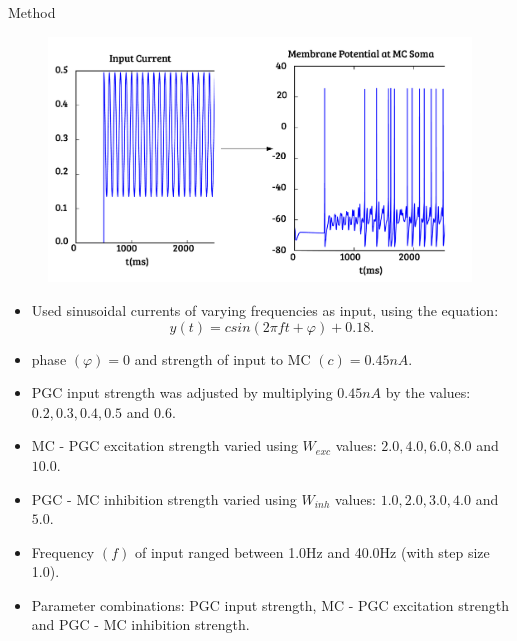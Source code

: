 \documentclass[final,hyperref={pdfpagelabels=false}]{beamer}
\begin{document}
\begin{frame}{}
\begin{columns}[t]
\begin{column}{.48\linewidth}
      \begin{block}{Method} 
      	\begin{figure}
      		\center
      		\includegraphics[scale=1.2]{images/Figure2}
      	\end{figure}
      	\begin{itemize}
      		\item Used sinusoidal currents of varying frequencies as input, using the equation:
      			\begin{equation}
      				y(t) = csin(2 \pi ft + \varphi) + 0.18. 
      			\end{equation}
      		\item phase $(\varphi) = 0$ and strength of input to MC $(c) = 0.45nA$.
      		\item PGC input strength was adjusted by multiplying $0.45nA$ by the values: $0.2, 0.3, 0.4, 0.5$ and $0.6$.
      		\item MC - PGC excitation strength varied using $W_{exc}$ values: $2.0, 4.0, 6.0, 8.0$ and $10.0$.
      		\item PGC - MC inhibition strength varied using $W_{inh}$ values: $1.0, 2.0, 3.0, 4.0$ and $5.0$.
      		\item Frequency $(f)$ of input ranged between 1.0Hz and 40.0Hz (with step size 1.0).
      		\item Parameter combinations: PGC input strength, MC - PGC excitation strength and PGC - MC inhibition strength.
      	\end{itemize}
      	\end{block}
      		
      		
      		
      		
      		
      		
      		
      		
      		

\end{column}
\end{columns}
\end{frame}
\end{document}
